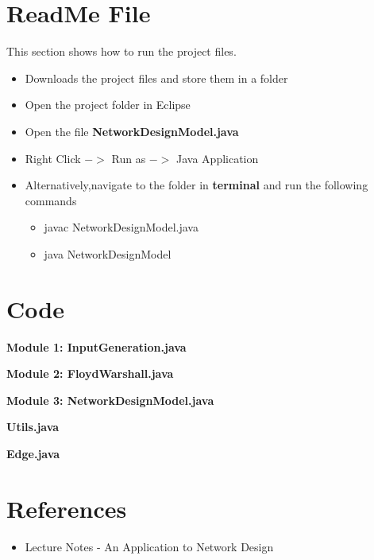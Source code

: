 \documentclass[12pt,letterpaper,titlepage,en-US]{article}
\begin{document}
  \section{ReadMe File}
  This section shows how to run the project files.
  \begin{itemize}
  \item Downloads the project files and store them in a folder
  \item Open the project folder in Eclipse
  \item Open the file \textbf{NetworkDesignModel.java}
  \item Right Click $->$ Run as $->$ Java Application
  \item Alternatively,navigate to the folder in \textbf{terminal} and run the following commands
  \begin{itemize}
  \item javac NetworkDesignModel.java
  \item java NetworkDesignModel
  \end{itemize}
  \end{itemize}

  

 
\section{Code}

\textbf{Module 1: InputGeneration.java}


\pagebreak
\textbf{Module 2: FloydWarshall.java}


\pagebreak
\textbf{Module 3: NetworkDesignModel.java}


\pagebreak
\textbf{Utils.java}


\textbf{Edge.java}



\section{References}
\begin{itemize}


\item Lecture Notes - An Application to Network Design
\end{itemize}
\end{document}
